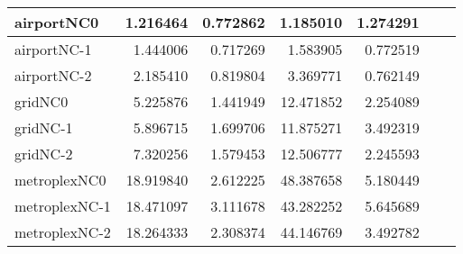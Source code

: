 \begin{longtable}{|l|r|r|r|r|r|r|}
airportNC0 & 1.216464 & 0.772862 & 1.185010 & 1.274291 \\ \hline
airportNC-1 & 1.444006 & 0.717269 & 1.583905 & 0.772519 \\ \hline
airportNC-2 & 2.185410 & 0.819804 & 3.369771 & 0.762149 \\ \hline
gridNC0 & 5.225876 & 1.441949 & 12.471852 & 2.254089 \\ \hline
gridNC-1 & 5.896715 & 1.699706 & 11.875271 & 3.492319 \\ \hline
gridNC-2 & 7.320256 & 1.579453 & 12.506777 & 2.245593 \\ \hline
metroplexNC0 & 18.919840 & 2.612225 & 48.387658 & 5.180449 \\ \hline
metroplexNC-1 & 18.471097 & 3.111678 & 43.282252 & 5.645689 \\ \hline
metroplexNC-2 & 18.264333 & 2.308374 & 44.146769 & 3.492782 \\ \hline
\end{longtable}

